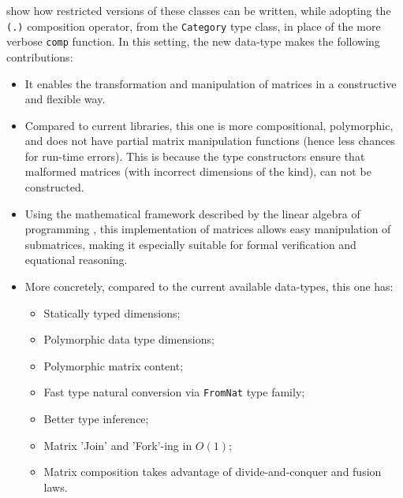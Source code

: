 \documentclass[
  oneside,
  11pt, a4paper,
  footinclude=true,
  headinclude=true,
  cleardoublepage=empty
]{scrbook}
\theoremstyle{definition}
\theoremstyle{definition}
\begin{document}
        \cite{10.1145/3406088.3409019} show how restricted versions of these classes can be written, while adopting the \texttt{(.)} composition operator, from the \texttt{Category} type class, in place of the more verbose \texttt{comp} function. In this setting, the new data-type makes the following contributions:
        
        \begin{itemize}
            \item It enables the transformation and manipulation of matrices in a constructive and flexible way.
            \item Compared to current libraries, this one is more compositional, polymorphic, and does not have partial matrix manipulation functions (hence less chances for run-time errors). This is because the type constructors ensure that malformed matrices (with incorrect dimensions of the kind), can not be constructed.
            \item Using the mathematical framework described by the linear algebra of programming \citep{oliveira2012towards}, this implementation of matrices allows easy manipulation of submatrices, making it especially suitable for formal verification and equational reasoning.
            \item More concretely, compared to the current available data-types, this one has:
                  \begin{itemize}
                    \item Statically typed dimensions;
                    \item Polymorphic data type dimensions;
                    \item Polymorphic matrix content;
                    \item Fast type natural conversion via \texttt{FromNat} type family;
                    \item Better type inference;
                    \item Matrix 'Join' and 'Fork'-ing in $O(1)$;
                    \item Matrix composition takes advantage of divide-and-conquer and fusion laws.
                  \end{itemize}
        \end{itemize}
        
        
\end{document}
